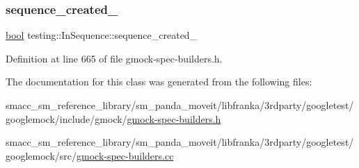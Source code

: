\subsubsection{\texorpdfstring{sequence\+\_\+created\+\_\+}{sequence\_created\_}}
{\footnotesize\ttfamily \hyperlink{classbool}{bool} testing\+::\+In\+Sequence\+::sequence\+\_\+created\+\_\+\hspace{0.3cm}{\ttfamily [private]}}



Definition at line 665 of file gmock-\/spec-\/builders.\+h.



The documentation for this class was generated from the following files\+:\begin{DoxyCompactItemize}
\item 
smacc\+\_\+sm\+\_\+reference\+\_\+library/sm\+\_\+panda\+\_\+moveit/libfranka/3rdparty/googletest/googlemock/include/gmock/\hyperlink{gmock-spec-builders_8h}{gmock-\/spec-\/builders.\+h}\item 
smacc\+\_\+sm\+\_\+reference\+\_\+library/sm\+\_\+panda\+\_\+moveit/libfranka/3rdparty/googletest/googlemock/src/\hyperlink{gmock-spec-builders_8cc}{gmock-\/spec-\/builders.\+cc}\end{DoxyCompactItemize}
